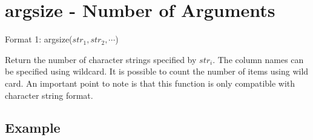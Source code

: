 
%

\section{argsize - Number of Arguments\label{sect:argsize}}

Format 1: argsize($str_1,str_2,\cdots$)

Return the number of character strings specified by $str_i$. The column names can be specified using wildcard. It is possible to count the number of items using wild card. An important point to note is that this function is only compatible with character string format.  


\subsection*{Example}


%

